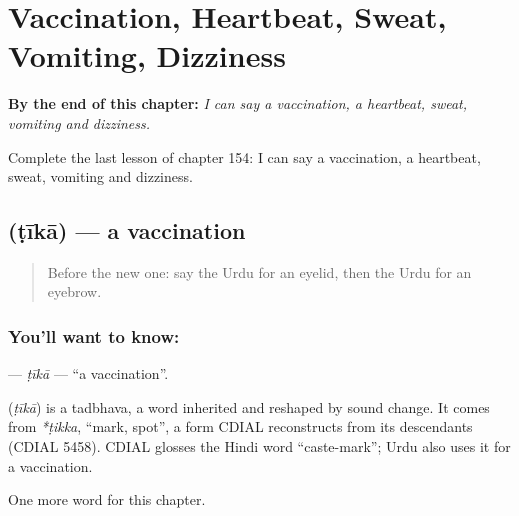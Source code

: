 
\chapter{Vaccination, Heartbeat, Sweat, Vomiting, Dizziness}
\label{ch:ur-vaccination-heartbeat-sweat-vomiting-dizziness}

\begin{chapteropening}
\textbf{By the end of this chapter:} \emph{I can say a vaccination, a heartbeat, sweat, vomiting and dizziness.}

Complete the last lesson of chapter 154: I can say a vaccination, a heartbeat, sweat, vomiting and dizziness.
\end{chapteropening}

\section[\texorpdfstring{\ur{ٹیکا} (ṭīkā)}{ٹیکا (ṭīkā)}]{ (ṭīkā) — a vaccination}

\label{lesson:UR-C154-tika}



\begin{quote}
Before the new one: say the Urdu for an eyelid, then the Urdu for an eyebrow.
\end{quote}

\subsection*{You'll want to know: }
\textbf{} — \emph{ṭīkā} — \textquotedblleft{}a vaccination\textquotedblright{}.

\begin{cousinweb}
\textbf{} (\emph{ṭīkā}) is a tadbhava, a word inherited and reshaped by sound change. It comes from \emph{*ṭikka}, \textquotedblleft{}mark, spot\textquotedblright{}, a form CDIAL reconstructs from its descendants (CDIAL 5458). CDIAL glosses the Hindi word \textquotedblleft{}caste-mark\textquotedblright{}; Urdu also uses it for a vaccination.
\end{cousinweb}

\begin{grammarlens}[title={What you've built}]
One more word for this chapter.
\end{grammarlens}

